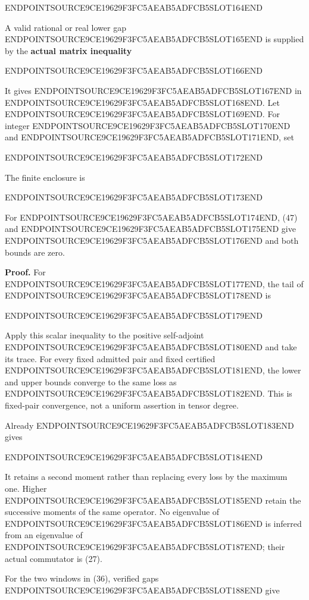 ENDPOINTSOURCE9CE19629F3FC5AEAB5ADFCB5SLOT164END

A valid rational or real lower gap ENDPOINTSOURCE9CE19629F3FC5AEAB5ADFCB5SLOT165END is supplied by the \textbf{actual matrix inequality}

ENDPOINTSOURCE9CE19629F3FC5AEAB5ADFCB5SLOT166END

It gives ENDPOINTSOURCE9CE19629F3FC5AEAB5ADFCB5SLOT167END in ENDPOINTSOURCE9CE19629F3FC5AEAB5ADFCB5SLOT168END. Let ENDPOINTSOURCE9CE19629F3FC5AEAB5ADFCB5SLOT169END. For integer ENDPOINTSOURCE9CE19629F3FC5AEAB5ADFCB5SLOT170END and ENDPOINTSOURCE9CE19629F3FC5AEAB5ADFCB5SLOT171END, set

ENDPOINTSOURCE9CE19629F3FC5AEAB5ADFCB5SLOT172END

The finite enclosure is

ENDPOINTSOURCE9CE19629F3FC5AEAB5ADFCB5SLOT173END

For ENDPOINTSOURCE9CE19629F3FC5AEAB5ADFCB5SLOT174END, (47) and ENDPOINTSOURCE9CE19629F3FC5AEAB5ADFCB5SLOT175END give ENDPOINTSOURCE9CE19629F3FC5AEAB5ADFCB5SLOT176END and both bounds are zero.

\textbf{Proof.} For ENDPOINTSOURCE9CE19629F3FC5AEAB5ADFCB5SLOT177END, the tail of ENDPOINTSOURCE9CE19629F3FC5AEAB5ADFCB5SLOT178END is

ENDPOINTSOURCE9CE19629F3FC5AEAB5ADFCB5SLOT179END

Apply this scalar inequality to the positive self-adjoint ENDPOINTSOURCE9CE19629F3FC5AEAB5ADFCB5SLOT180END and take its trace. For every fixed admitted pair and fixed certified ENDPOINTSOURCE9CE19629F3FC5AEAB5ADFCB5SLOT181END, the lower and upper bounds converge to the same loss as ENDPOINTSOURCE9CE19629F3FC5AEAB5ADFCB5SLOT182END. This is fixed-pair convergence, not a uniform assertion in tensor degree.

Already ENDPOINTSOURCE9CE19629F3FC5AEAB5ADFCB5SLOT183END gives

ENDPOINTSOURCE9CE19629F3FC5AEAB5ADFCB5SLOT184END

It retains a second moment rather than replacing every loss by the maximum one. Higher ENDPOINTSOURCE9CE19629F3FC5AEAB5ADFCB5SLOT185END retain the successive moments of the same operator. No eigenvalue of ENDPOINTSOURCE9CE19629F3FC5AEAB5ADFCB5SLOT186END is inferred from an eigenvalue of ENDPOINTSOURCE9CE19629F3FC5AEAB5ADFCB5SLOT187END; their actual commutator is (27).

For the two windows in (36), verified gaps ENDPOINTSOURCE9CE19629F3FC5AEAB5ADFCB5SLOT188END give

